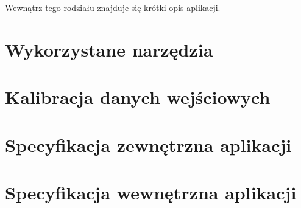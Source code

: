 Wewnątrz tego rodziału znajduje się krótki opis aplikacji.
\section{Wykorzystane narzędzia}
\section{Kalibracja danych wejściowych}
\label{sec:calibration}
\section{Specyfikacja zewnętrzna aplikacji}
\section{Specyfikacja wewnętrzna aplikacji}
